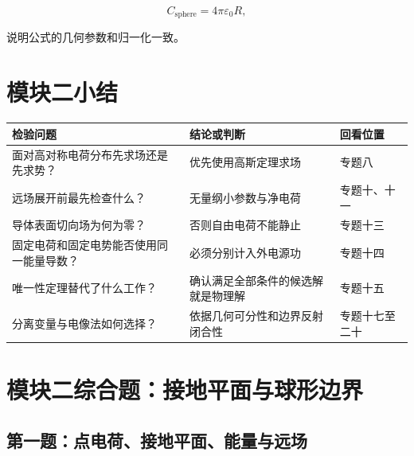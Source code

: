\[
\boxed{
C_{\text{sphere}}=4\pi\varepsilon_0R
},
\]

说明公式的几何参数和归一化一致。

\section{模块二小结}\label{m2:ux6a21ux5757ux4e8cux5c0fux7ed3}

{\def\LTcaptype{none} %
\begin{longtable}[]{@{}
  >{\raggedright\arraybackslash}p{}
  >{\raggedright\arraybackslash}p{}
  >{\raggedright\arraybackslash}p{}@{}}
\toprule\noalign{}
\begin{minipage}[b]{\linewidth}\raggedright
检验问题
\end{minipage} & \begin{minipage}[b]{\linewidth}\raggedright
结论或判断
\end{minipage} & \begin{minipage}[b]{\linewidth}\raggedright
回看位置
\end{minipage} \\
\midrule\noalign{}
\endhead
\bottomrule\noalign{}
\endlastfoot
面对高对称电荷分布先求场还是先求势？ & 优先使用高斯定理求场 & 专题八 \\
远场展开前最先检查什么？ & 无量纲小参数与净电荷 & 专题十、十一 \\
导体表面切向场为何为零？ & 否则自由电荷不能静止 & 专题十三 \\
固定电荷和固定电势能否使用同一能量导数？ & 必须分别计入外电源功 &
专题十四 \\
唯一性定理替代了什么工作？ & 确认满足全部条件的候选解就是物理解 &
专题十五 \\
分离变量与电像法如何选择？ & 依据几何可分性和边界反射闭合性 &
专题十七至二十 \\
\end{longtable}
}

\section{模块二综合题：接地平面与球形边界}\label{m2:ux6a21ux5757ux4e8cux7efcux5408ux9898ux63a5ux5730ux5e73ux9762ux4e0eux7403ux5f62ux8fb9ux754c}

\subsection{第一题：点电荷、接地平面、能量与远场}\label{m2:ux7b2cux4e00ux9898ux70b9ux7535ux8377ux63a5ux5730ux5e73ux9762ux80fdux91cfux4e0eux8fdcux573a}

